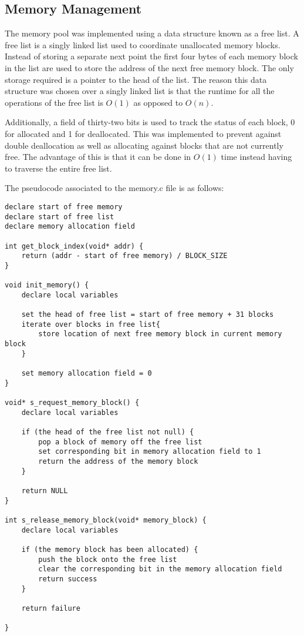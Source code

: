 \documentclass[oneside]{article}
\begin{document}
\subsection*{Memory Management}
The memory pool was implemented using a data structure known as a free list. A free list is a singly linked list used to coordinate unallocated memory blocks. Instead of storing a separate next point the first four bytes of each memory block in the list are used to store the address of the next free memory block. The only storage required is a pointer to the head of the list. The reason this data structure was chosen over a singly linked list is that the runtime for all the operations of the free list is $O(1)$ as opposed to $O(n)$. 

Additionally, a field of thirty-two bits is used to track the status of each block, 0 for allocated and 1 for deallocated. This was implemented to prevent against double deallocation as well as allocating against blocks that are not currently free. The advantage of this is that it can be done in $O(1)$ time instead having to traverse the entire free list.

The pseudocode associated to the memory.c file is as follows:
\begin{lstlisting}
declare start of free memory
declare start of free list
declare memory allocation field

int get_block_index(void* addr) {
    return (addr - start of free memory) / BLOCK_SIZE
}

void init_memory() {
    declare local variables
	
    set the head of free list = start of free memory + 31 blocks
    iterate over blocks in free list{
        store location of next free memory block in current memory block	
    }

    set memory allocation field = 0
}

void* s_request_memory_block() {
    declare local variables
	
    if (the head of the free list not null) {
        pop a block of memory off the free list
        set corresponding bit in memory allocation field to 1		
        return the address of the memory block
    }
	
    return NULL
}

int s_release_memory_block(void* memory_block) {
    declare local variables
	
    if (the memory block has been allocated) {
        push the block onto the free list
        clear the corresponding bit in the memory allocation field
        return success
    }

    return failure

}
\end{lstlisting}
\end{document}
